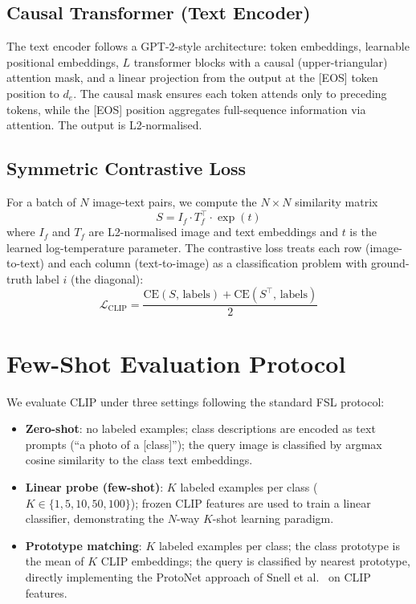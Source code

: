 \documentclass{iutbscthesis}
\begin{document}
\subsection{Causal Transformer (Text Encoder)}
The text encoder follows a GPT-2-style architecture: token embeddings, learnable positional embeddings, $L$ transformer blocks with a causal (upper-triangular) attention mask, and a linear projection from the output at the [EOS] token position to $d_e$. The causal mask ensures each token attends only to preceding tokens, while the [EOS] position aggregates full-sequence information via attention. The output is L2-normalised.

\subsection{Symmetric Contrastive Loss}
For a batch of $N$ image-text pairs, we compute the $N \times N$ similarity matrix
\begin{equation}
    S = I_f \cdot T_f^{\top} \cdot \exp(t)
\end{equation}
where $I_f$ and $T_f$ are L2-normalised image and text embeddings and $t$ is the learned log-temperature parameter. The contrastive loss treats each row (image-to-text) and each column (text-to-image) as a classification problem with ground-truth label $i$ (the diagonal):
\begin{equation}
    \mathcal{L}_{\mathrm{CLIP}} = \frac{\mathrm{CE}(S,\, \mathrm{labels}) + \mathrm{CE}(S^{\top},\, \mathrm{labels})}{2}
\end{equation}

\section{Few-Shot Evaluation Protocol}

We evaluate CLIP under three settings following the standard FSL protocol:

\begin{itemize}
    \item \textbf{Zero-shot}: no labeled examples; class descriptions are encoded as text prompts (``a photo of a [class]''); the query image is classified by argmax cosine similarity to the class text embeddings.
    \item \textbf{Linear probe (few-shot)}: $K$ labeled examples per class ($K \in \{1, 5, 10, 50, 100\}$); frozen CLIP features are used to train a linear classifier, demonstrating the $N$-way $K$-shot learning paradigm.
    \item \textbf{Prototype matching}: $K$ labeled examples per class; the class prototype is the mean of $K$ CLIP embeddings; the query is classified by nearest prototype, directly implementing the ProtoNet approach of Snell et al.\ \cite{snell2017protonet} on CLIP features.
\end{itemize}
\end{document}
